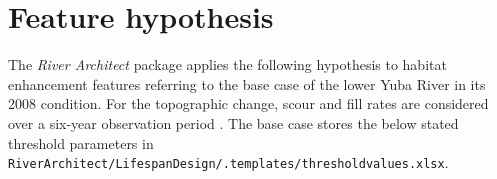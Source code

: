 %
%


\section{Feature hypothesis} \label{sec:feat}

The \textit{River Architect} package applies the following hypothesis to habitat enhancement features referring to the base case of the lower Yuba River in its 2008 condition. For the topographic change, scour and fill rates are considered over a six-year observation period \citep[2008 to 2014, see][]{weber17}. The base case stores the below stated threshold parameters in \texttt{RiverArchitect/LifespanDesign/.templates/threshold{\myUnderscore}values.xlsx}.

